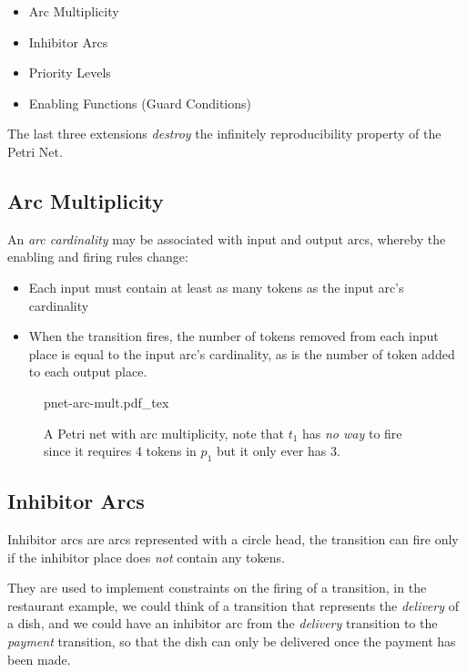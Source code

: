 \documentclass[openright, twoside, twocolumn, a4paper, 10pt]{report}
\newcommand{\incsvg}[2]{%
	\def\svgwidth{\columnwidth}
	{#2.pdf_tex}%
}
\begin{document}
\begin{itemize}
	\item Arc Multiplicity
	\item Inhibitor Arcs
	\item Priority Levels
	\item Enabling Functions (Guard Conditions)
\end{itemize}

\begin{remark}
	The last three extensions \emph{destroy} the infinitely reproducibility property of the Petri Net.
\end{remark}

\subsection{Arc Multiplicity}

An \emph{arc cardinality} may be associated with input and output arcs, whereby the enabling and firing
rules change:

\begin{itemize}
	\item Each input must contain at least as many tokens as the input arc's cardinality
	\item When the transition fires, the number of tokens removed from each input place is equal to the input arc's cardinality,
	      as is the number of token added to each output place.
\end{itemize}

\begin{figure}[ht]
	\centering
	\incsvg{fig}{pnet-arc-mult}\\
	\caption{A Petri net with arc multiplicity, note that $ t_1$ has \emph{no way} to fire since it requires
		4 tokens in $ p_1$ but it only ever has $3$. }\label{fig:pnet-arc-mult}
\end{figure}

\subsection{Inhibitor Arcs}
Inhibitor arcs are arcs represented with a circle head, the transition can fire only if the inhibitor place
does \emph{not} contain any tokens.

They are used to implement constraints on the firing of a transition, in the restaurant example, we
could think of a transition that represents the \emph{delivery} of a dish, and we could have an inhibitor
arc from the \emph{delivery} transition to the \emph{payment} transition, so that the dish can only be
delivered once the payment has been made.
\end{document}
